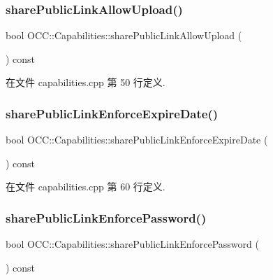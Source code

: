 \subsubsection{\texorpdfstring{share\+Public\+Link\+Allow\+Upload()}{sharePublicLinkAllowUpload()}}
{\footnotesize\ttfamily bool O\+C\+C\+::\+Capabilities\+::share\+Public\+Link\+Allow\+Upload (\begin{DoxyParamCaption}{ }\end{DoxyParamCaption}) const}



在文件 capabilities.\+cpp 第 50 行定义.

\mbox{\label{class_o_c_c_1_1_capabilities_aaf31321b6498c31f113247bb94016f5c}} 
\subsubsection{\texorpdfstring{share\+Public\+Link\+Enforce\+Expire\+Date()}{sharePublicLinkEnforceExpireDate()}}
{\footnotesize\ttfamily bool O\+C\+C\+::\+Capabilities\+::share\+Public\+Link\+Enforce\+Expire\+Date (\begin{DoxyParamCaption}{ }\end{DoxyParamCaption}) const}



在文件 capabilities.\+cpp 第 60 行定义.

\mbox{\label{class_o_c_c_1_1_capabilities_a93c18b67a270ad8432dd76ad029b52bc}} 
\subsubsection{\texorpdfstring{share\+Public\+Link\+Enforce\+Password()}{sharePublicLinkEnforcePassword()}}
{\footnotesize\ttfamily bool O\+C\+C\+::\+Capabilities\+::share\+Public\+Link\+Enforce\+Password (\begin{DoxyParamCaption}{ }\end{DoxyParamCaption}) const}



